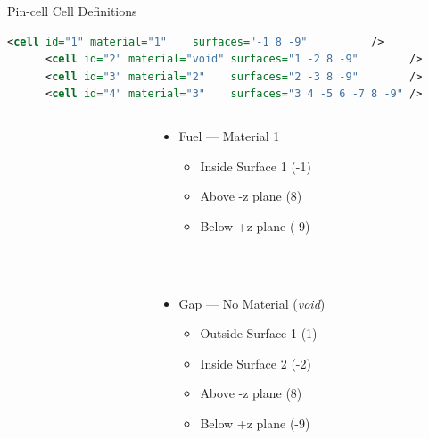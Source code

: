 \documentclass[serif]{beamer}
\begin{document}
\begin{frame}[fragile]{Pin-cell Cell Definitions}

  \begin{scriptsize}
    \begin{lstlisting}[language=XML]
      <cell id="1" material="1"    surfaces="-1 8 -9"          /> 
      <cell id="2" material="void" surfaces="1 -2 8 -9"        />
      <cell id="3" material="2"    surfaces="2 -3 8 -9"        />
      <cell id="4" material="3"    surfaces="3 4 -5 6 -7 8 -9" />
    \end{lstlisting}
  \end{scriptsize}
  \vfill
  \begin{columns}
    \begin{column}{0.3\linewidth}
      \begin{center}
      \end{center}
    \end{column}
    \begin{column}{0.4\linewidth}\footnotesize
	  \begin{itemize}
        \item<1-> {\color{red} Fuel} --- Material 1
        \begin{itemize}\scriptsize
           \item<1-> Inside Surface 1 (-1)
           \item<1-> Above -z plane (8)
           \item<1-> Below +z plane (-9)
        \end{itemize}
        ~\\
        ~\\
        \item<1-> {\color{green} Gap} --- No Material (\emph{void})
        \begin{itemize}\scriptsize
           \item<1-> Outside Surface 1 (1)
           \item<1-> Inside Surface 2 (-2) 
           \item<1-> Above -z plane (8)
           \item<1-> Below +z plane (-9)
        \end{itemize}

\end{itemize}
\end{column}
\end{columns}
\end{frame}
\end{document}
